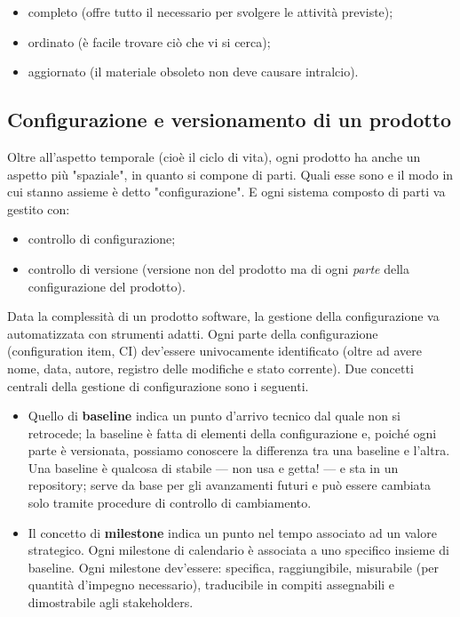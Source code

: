 \documentclass[a4paper]{article}
\begin{document}
	\begin{itemize}
		
			
	\item completo (offre tutto il necessario per svolgere le attività previste);
			
	\item ordinato (è facile trovare ciò che vi si cerca);
			
	\item aggiornato (il materiale obsoleto non deve causare intralcio).
		
	\end{itemize}


		
	\subsection{Configurazione e versionamento di un prodotto}

		
Oltre all'aspetto temporale (cioè il ciclo di vita), ogni prodotto ha anche un aspetto più "spaziale", in quanto si compone di parti. Quali esse sono e il modo in cui stanno assieme è detto "configurazione". E ogni sistema composto di parti va gestito con:
		
	\begin{itemize}
		
			
	\item controllo di configurazione;
			
	\item controllo di versione (versione non del prodotto ma di ogni \emph{parte} della configurazione del prodotto).
		
	\end{itemize}

		
Data la complessità di un prodotto software, la gestione della configurazione va automatizzata con strumenti adatti. Ogni parte della configurazione (configuration item, CI) dev'essere univocamente identificato (oltre ad avere nome, data, autore, registro delle modifiche e stato corrente). Due concetti centrali della gestione di configurazione sono i seguenti.
		
	\begin{itemize}
		
			
	\item Quello di \textbf{baseline} indica un punto d'arrivo tecnico dal quale non si retrocede; la baseline è fatta di elementi della configurazione e, poiché ogni parte è versionata, possiamo conoscere la differenza tra una baseline e l'altra. Una baseline è qualcosa di stabile --- non usa e getta! --- e sta in un repository; serve da base per gli avanzamenti futuri e può essere cambiata solo tramite procedure di controllo di cambiamento.
			
	\item Il concetto di \textbf{milestone} indica un punto nel tempo associato ad un valore strategico. Ogni milestone di calendario è associata a uno specifico insieme di baseline. Ogni milestone dev'essere: specifica, raggiungibile, misurabile (per quantità d'impegno necessario), traducibile in compiti assegnabili e dimostrabile agli stakeholders.
		
	\end{itemize}
\end{document}
